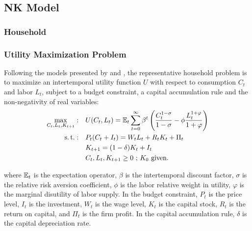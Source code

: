 \documentclass[
thesis.tex
]{subfiles}
\begin{document}
	
	\newpage
	
	\subsection{NK Model}
	
	
	\subsubsection{Household}
	
	\subsubsection*{Utility Maximization Problem}
	
	
	Following the models presented by \textcite{costa_junior_understanding_2016} and \textcite{solis-garcia_ucb_2022}, the representative household problem is to maximize an intertemporal utility function $U$ with respect to consumption $C_t$ and labor $L_t$, subject to a budget constraint, a capital accumulation rule and the non-negativity of real variables:
	\begin{align}
		\label{eq:household-utility-function}
		\max_{C_t,L_t,K_{t+1}}: \quad & U(C_t,L_t) = {\mathbb{E}_{t}} \sum_{t=0}^{\infty} \beta^t \left(\frac{C_t^{1-\sigma}}{1-\sigma} - \phi \frac{L_t^{1+\varphi}}{1+\varphi} \right) \\
		\label{eq:household-budget-constraint}
		\operatorname{s.t.}: \quad & P_t (C_t + I_t) = W_t L_t + R_t K_t + \Pi_t \\
		\label{eq:law-of-motion-for-capital}
		\quad & K_{t+1} = (1-\delta)K_t + I_t \\
		\quad & C_t,L_t,K_{t+1} \geq 0 \text{ ; $K_0$ given.} \nonumber
	\end{align}
	
	where ${\mathbb{E}_{t}}$ is the expectation operator, $\beta$ is the intertemporal discount factor, $\sigma$ is the relative risk aversion coefficient, $\phi$ is the labor relative weight in utility, $\varphi$ is the marginal disutility of labor supply. In the budget constraint, $P_t$ is the price level, $I_t$ is the investment, $W_t$ is the wage level, $K_t$ is the capital stock, $R_t$ is the return on capital, and $\Pi_t$ is the firm profit. In the capital accumulation rule, $\delta$ is the capital depreciation rate.
	
\end{document}
